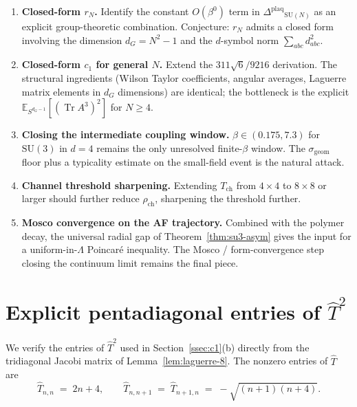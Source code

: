 \documentclass[11pt,a4paper]{article}
\theoremstyle{definition}
\newcommand{\SU}{\mathrm{SU}}
\newcommand{\Tr}{\operatorname{Tr}}
\newcommand{\E}{\mathbb{E}}
\newcommand{\Gap}{{\Delta^{\mathrm{plaq}}}}
\begin{document}
\begin{enumerate}[label=(O\arabic*)]
\item\textbf{Closed-form $r_N$.} Identify the constant
$O(\beta^0)$ term in $\Gap_{\SU(N)}$ as an explicit
group-theoretic combination. Conjecture: $r_N$ admits a closed form
involving the dimension $d_G = N^2-1$ and the $d$-symbol norm
$\sum_{abc}d_{abc}^2$.

\item\textbf{Closed-form $c_1$ for general $N$.} Extend the
$311\sqrt 6/9216$ derivation. The structural ingredients (Wilson
Taylor coefficients, angular averages, Laguerre matrix elements in
$d_G$ dimensions) are identical; the bottleneck is the explicit
$\E_{S^{d_G-1}}[(\Tr A^3)^2]$ for $N\ge 4$.

\item\textbf{Closing the intermediate coupling window.}
$\beta \in (0.175, 7.3)$ for $\SU(3)$ in $d=4$ remains the only
unresolved finite-$\beta$ window. The $\sigma_{\mathrm{geom}}$ floor
plus a typicality estimate on the small-field event is the natural
attack.

\item\textbf{Channel threshold sharpening.} Extending
$T_{\mathrm{ch}}$ from $4\times 4$ to $8\times 8$ or larger should
further reduce $\rho_{\mathrm{ch}}$, sharpening the threshold further.

\item\textbf{Mosco convergence on the AF trajectory.} Combined with
the polymer decay, the universal radial gap of Theorem~\ref{thm:su3-asym}
gives the input for a uniform-in-$\Lambda$ Poincar\'e inequality. The
Mosco / form-convergence step closing the continuum limit remains the
final piece.
\end{enumerate}

\appendix

\section{Explicit pentadiagonal entries of $\hat T^2$}\label{app:T2}

We verify the entries of $\hat T^2$ used in
Section~\ref{ssec:c1}(b) directly from the tridiagonal Jacobi matrix
of Lemma~\ref{lem:laguerre-8}. The nonzero entries of $\hat T$ are
\[
\hat T_{n,n} \;=\; 2n+4,
\qquad
\hat T_{n,n+1} \;=\; \hat T_{n+1,n} \;=\; -\sqrt{(n+1)(n+4)}.
\]
\end{document}
